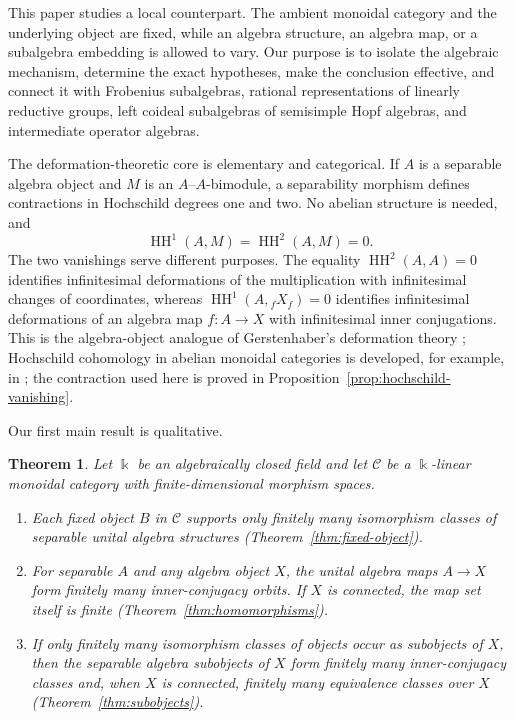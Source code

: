 \documentclass[11pt]{amsart}
\newtheorem{theorem}{Theorem}[section]
\theoremstyle{definition}
\theoremstyle{remark}
\newcommand{\C}{\mathcal C}
\newcommand{\kk}{\Bbbk}
\DeclareMathOperator{\HH}{HH}
\begin{document}
This paper studies a local counterpart.  The ambient monoidal category and
the underlying object are fixed, while an algebra structure, an algebra map,
or a subalgebra embedding is allowed to vary.  Our purpose is to isolate the
algebraic mechanism, determine the exact
hypotheses, make the conclusion effective, and connect it with Frobenius
subalgebras, rational representations of linearly reductive groups,
left coideal subalgebras of semisimple Hopf algebras, and intermediate
operator algebras.

The deformation-theoretic core is elementary and categorical.  If $A$ is a
separable algebra object and $M$ is an $A$--$A$-bimodule, a separability
morphism defines contractions in Hochschild degrees one and two.
No abelian structure is needed, and
\[
  \HH^1(A,M)=\HH^2(A,M)=0.
\]
The two vanishings serve different purposes.  The equality
$\HH^2(A,A)=0$ identifies infinitesimal deformations of the multiplication
with infinitesimal changes of coordinates, whereas
$\HH^1(A,{}_fX_f)=0$ identifies infinitesimal deformations of an algebra map
$f:A\to X$ with infinitesimal inner conjugations.  This is the algebra-object
analogue of Gerstenhaber's deformation theory \cite{Gerstenhaber};
Hochschild cohomology in abelian monoidal categories is developed, for
example, in \cite{AMS}; the contraction used here is proved in
Proposition~\ref{prop:hochschild-vanishing}.

Our first main result is qualitative.

\begin{theorem}\label{thm:intro-local}
Let $\kk$ be an algebraically closed field and let $\C$ be a $\kk$-linear
monoidal category with finite-dimensional
morphism spaces.
\begin{enumerate}
  \item Each fixed object $B$ in $\C$ supports only finitely many isomorphism
  classes of separable unital algebra structures
  \textup{(Theorem~\ref{thm:fixed-object})}.
  \item For separable $A$ and any algebra object $X$, the unital algebra maps
  $A\to X$ form finitely many inner-conjugacy orbits.  If $X$ is connected,
  the map set itself is finite
  \textup{(Theorem~\ref{thm:homomorphisms})}.
  \item If only finitely many isomorphism classes of objects occur as
  subobjects of $X$, then the separable algebra subobjects of $X$ form
  finitely many inner-conjugacy classes and, when $X$ is connected, finitely
  many equivalence classes over $X$
  \textup{(Theorem~\ref{thm:subobjects})}.
\end{enumerate}
\end{theorem}
\end{document}
